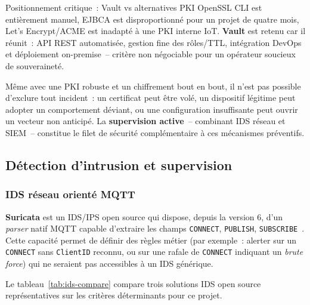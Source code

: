 \begin{resultbox}{Positionnement critique~: Vault vs alternatives PKI}
OpenSSL CLI est entièrement manuel, EJBCA est disproportionné pour un projet de quatre mois, Let's Encrypt/ACME est inadapté à une PKI interne IoT. \textbf{Vault} est retenu car il réunit~: API REST automatisée, gestion fine des rôles/TTL, intégration DevOps et déploiement on-premise~-- critère non négociable pour un opérateur soucieux de souveraineté.
\end{resultbox}

Même avec une PKI robuste et un chiffrement bout en bout, il n'est pas possible d'exclure tout incident~: un certificat peut être volé, un dispositif légitime peut adopter un comportement déviant, ou une configuration insuffisante peut ouvrir un vecteur non anticipé. La \textbf{supervision active}~-- combinant IDS réseau et SIEM~-- constitue le filet de sécurité complémentaire à ces mécanismes préventifs.

\subsection{Détection d'intrusion et supervision}
\label{sec:ea-ids-siem}

\subsubsection{IDS réseau orienté MQTT}

\textbf{Suricata} est un IDS/IPS open source qui dispose, depuis la version 6, d'un \emph{parser} natif MQTT capable d'extraire les champs \texttt{CONNECT}, \texttt{PUBLISH}, \texttt{SUBSCRIBE}~\cite{suricata_mqtt}. Cette capacité permet de définir des règles métier (par exemple~: alerter sur un \texttt{CONNECT} sans \texttt{ClientID} reconnu, ou sur une rafale de \texttt{CONNECT} indiquant un \emph{brute force}) qui ne seraient pas accessibles à un IDS générique.

Le tableau~\ref{tab:ids-compare} compare trois solutions IDS open source représentatives sur les critères déterminants pour ce projet.

